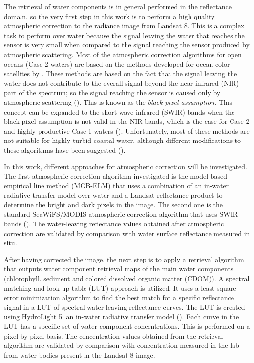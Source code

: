 The retrieval of water components is in general performed in the reflectance domain, so the very first step in this work is to perform a high quality atmospheric correction to the radiance image from Landsat 8. This is a complex task to perform over water because the signal leaving the water that reaches the sensor is very small when compared to the signal reaching the sensor produced by atmospheric scattering. Most of the atmospheric correction algorithms for open oceans (Case 2 waters) are based on the methods developed for ocean color satellites by \cite{Gordon:1997}. These methods are based on the fact that the signal leaving the water does not contribute to the overall signal beyond the near infrared (NIR) part of the spectrum; so the signal reaching the sensor is caused only by atmospheric scattering (\cite{Gordon:1994}). This is known as the {\it black pixel assumption}. This concept can be expanded to the short wave infrared (SWIR) bands when the black pixel assumption is not valid in the NIR bands, which is the case for Case 2 and highly productive Case 1 waters (\cite{Wang:2007}). Unfortunately, most of these methods are not suitable for highly turbid coastal water, although different modifications to these algorithms have been suggested (\cite{Patt2003}).

In this work, different approaches for atmospheric correction will be investigated. The first atmospheric correction algorithm investigated is the model-based empirical line method (MOB-ELM) that uses a combination of an in-water radiative transfer model over water and a Landsat reflectance product to determine the bright and dark pixels in the image. The second one is the standard SeaWiFS/MODIS atmospheric correction algorithm that uses SWIR bands (\cite{Wang:2007}). The water-leaving reflectance values obtained after atmospheric correction are validated by comparison with water surface reflectance measured in situ. 

After having corrected the image, the next step is to apply a retrieval algorithm that outputs water component retrieval maps of the main water components (chlorophyll, { sediment} and colored dissolved organic matter (CDOM)). A spectral matching and look-up table (LUT) approach is utilized. It uses a least square error minimization algorithm to find the best match for a specific reflectance signal in a LUT of spectral water-leaving reflectance curves. The LUT is created using HydroLight 5, an in-water radiative transfer model (\cite{Mobley:2005}). Each curve in the LUT has a specific set of water component concentrations. This is performed on a pixel-by-pixel basis. The concentration values obtained from the retrieval algorithm are validated by comparison with concentration measured in the lab from water bodies present in the Landsat 8 image.

